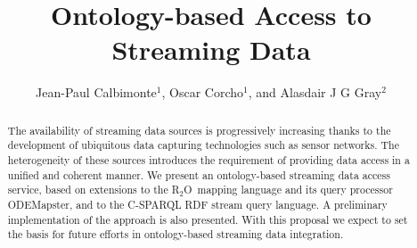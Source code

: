 \documentclass[runningheads,a4paper]{llncs}
\newcommand{\keywords}[1]{\par\addvspace\baselineskip
\noindent\keywordname\enspace\ignorespaces#1}
\newcommand{\subscript}[1]{\ensuremath{_{\textrm{#1}}}}
\newcommand{\rtwoo}{\textsf{R\subscript{2}O}}
\begin{document}
\mainmatter  %

\title{Ontology-based Access to Streaming Data}


%
%
\author{Jean-Paul Calbimonte$^1$, Oscar Corcho$^1$, and Alasdair J G Gray$^2$}
%

%
%

\maketitle

\vspace{-10pt}
\begin{abstract}
The availability of streaming data sources is progressively increasing thanks to the development of ubiquitous data capturing technologies such as sensor networks. The heterogeneity of these sources introduces the requirement of providing data access in a unified and coherent manner. We present an ontology-based streaming data access service, based on extensions to the \rtwoo\ mapping language and its query processor ODEMapster, and to the C-SPARQL RDF stream query language. A preliminary implementation of the approach is also presented. With this proposal we expect to set the basis for future efforts in ontology-based streaming data integration.

\end{abstract}
\end{document}
